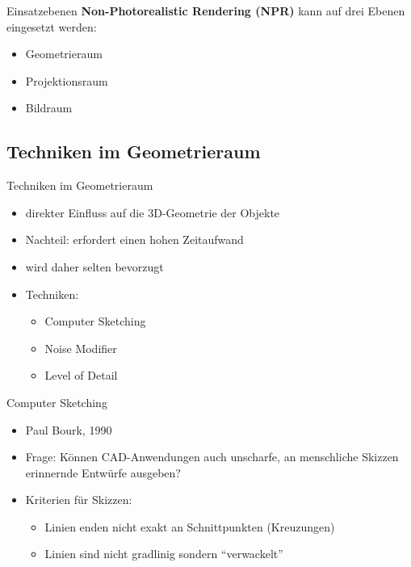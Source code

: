 \begin{frame}{Einsatzebenen}
  \textbf{Non-Photorealistic Rendering (NPR)} kann auf drei Ebenen eingesetzt werden:
  \begin{itemize}
    \item Geometrieraum
    \item Projektionsraum
    \item Bildraum
  \end{itemize}
\end{frame}

\subsection{Techniken im Geometrieraum}
\begin{frame}{Techniken im Geometrieraum}
  \begin{itemize}
    \item direkter Einfluss auf die 3D-Geometrie der Objekte
    \item Nachteil: erfordert einen hohen Zeitaufwand
    \item wird daher selten bevorzugt
    \item Techniken:
    \begin{itemize}
      \item Computer Sketching
      \item Noise Modifier
      \item Level of Detail
    \end{itemize}
  \end{itemize}
\end{frame}

\begin{frame}{Computer Sketching}
  \begin{itemize}
    \item Paul Bourk, 1990
    \item Frage: Können CAD-Anwendungen auch unscharfe,
    an menschliche Skizzen erinnernde Entwürfe
    ausgeben?
    \item Kriterien für Skizzen:
    \begin{itemize}
      \item Linien enden nicht exakt an Schnittpunkten (Kreuzungen)
      \item Linien sind nicht gradlinig sondern "`verwackelt"'
    \end{itemize}
  \end{itemize}
\end{frame}

